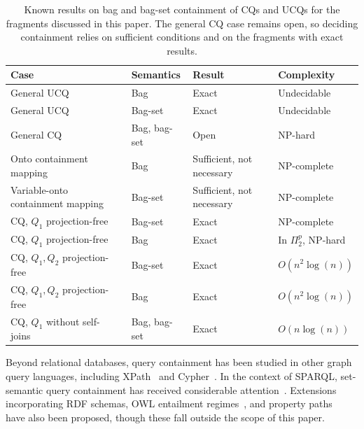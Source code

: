 \begin{table}[!t]
  \caption{Known results on bag and bag-set containment of \acp{CQ} and \acp{UCQ} for the fragments discussed in this paper.
The general \ac{CQ} case remains open, so deciding containment relies on sufficient conditions and on the fragments with exact results.}
  \label{tab_decidable_containment_bag_bag_set}
  \begin{tabular}{llll}
    \toprule
    Case & Semantics & Result & Complexity\\
    \midrule
    General \ac{UCQ}~\cite{ioannidis1995containment} & Bag & Exact & Undecidable\\
    General \ac{UCQ}~\cite{ioannidis1995containment, Jayram2006} & Bag-set & Exact & Undecidable\\
    General \ac{CQ}~\cite{Afrati2010, Konstantinidis2019, marcinkowski2024bag} & Bag, bag-set & Open & NP-hard\\
    Onto containment mapping~\cite{Chaudhuri1993} & Bag & Sufficient, not necessary & NP-complete\\
    Variable-onto containment mapping~\cite{Chaudhuri1993} & Bag-set & Sufficient, not necessary & NP-complete\\
    \ac{CQ}, $Q_1$ projection-free~\cite{Afrati2010} & Bag-set & Exact & NP-complete\\
    \ac{CQ}, $Q_1$ projection-free~\cite{Konstantinidis2019} & Bag & Exact & In $\Pi^p_2$, NP-hard\\
    \ac{CQ}, $Q_1,Q_2$ projection-free~\cite{Afrati2010} & Bag-set & Exact & $O(n^2\log(n))$\\
    \ac{CQ}, $Q_1,Q_2$ projection-free~\cite{Afrati2010} & Bag & Exact & $O(n^2\log(n))$\\
    \ac{CQ}, $Q_1$ without self-joins~\cite{ioannidis1995containment, Afrati2010} & Bag, bag-set & Exact & $O(n\log(n))$\\
    \bottomrule
  \end{tabular}
\end{table}

Beyond relational databases, query containment has been studied in other graph query languages, including XPath~\cite{schwentick2004xpath} and Cypher~\cite{tang2025proving}.
In the context of SPARQL, set-semantic query containment has received considerable attention~\cite{WudageChekol2013, letelier2013static, pichler2014containment, chekol2012sparql, chekol2012sparql2, Stadler2018, jenaQC, Spasic2023}.
Extensions incorporating RDF schemas, OWL entailment regimes~\cite{WudageChekol2013}, and property paths~\cite{Kostylev2025, chekol2016containment} have also been proposed, though these fall outside the scope of this paper.


